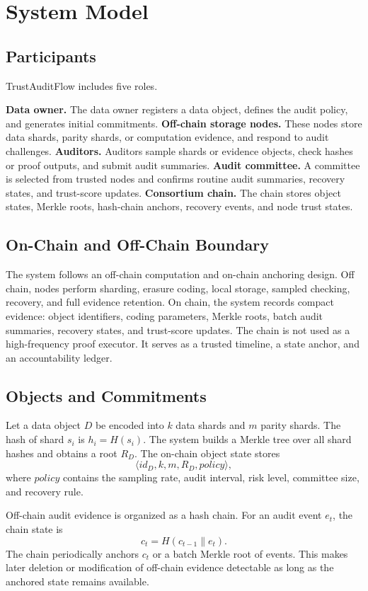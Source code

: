 \section{System Model}

\subsection{Participants}

TrustAuditFlow includes five roles.

\textbf{Data owner.} The data owner registers a data object, defines the audit policy, and generates initial commitments.
\textbf{Off-chain storage nodes.} These nodes store data shards, parity shards, or computation evidence, and respond to audit challenges.
\textbf{Auditors.} Auditors sample shards or evidence objects, check hashes or proof outputs, and submit audit summaries.
\textbf{Audit committee.} A committee is selected from trusted nodes and confirms routine audit summaries, recovery states, and trust-score updates.
\textbf{Consortium chain.} The chain stores object states, Merkle roots, hash-chain anchors, recovery events, and node trust states.

\subsection{On-Chain and Off-Chain Boundary}

The system follows an off-chain computation and on-chain anchoring design. Off chain, nodes perform sharding, erasure coding, local storage, sampled checking, recovery, and full evidence retention. On chain, the system records compact evidence: object identifiers, coding parameters, Merkle roots, batch audit summaries, recovery states, and trust-score updates. The chain is not used as a high-frequency proof executor. It serves as a trusted timeline, a state anchor, and an accountability ledger.

\subsection{Objects and Commitments}

Let a data object $D$ be encoded into $k$ data shards and $m$ parity shards. The hash of shard $s_i$ is $h_i=H(s_i)$. The system builds a Merkle tree over all shard hashes and obtains a root $R_D$. The on-chain object state stores
\begin{equation}
  \langle id_D, k, m, R_D, policy \rangle,
\end{equation}
where $policy$ contains the sampling rate, audit interval, risk level, committee size, and recovery rule.

Off-chain audit evidence is organized as a hash chain. For an audit event $e_t$, the chain state is
\begin{equation}
  c_t = H(c_{t-1} \parallel e_t).
\end{equation}
The chain periodically anchors $c_t$ or a batch Merkle root of events. This makes later deletion or modification of off-chain evidence detectable as long as the anchored state remains available.
